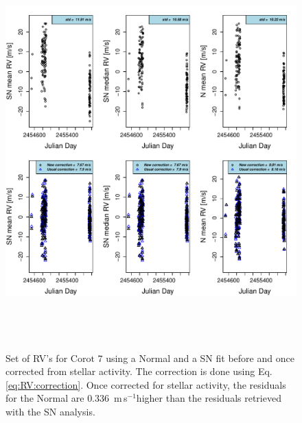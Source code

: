 \documentclass{aa}
\def\ms{\hbox{\,m\,s$^{-1}$}}         %
\begin{document}
\begin{figure} 
\begin{center}
\includegraphics[height = 6in]{NEW_CORRECTIONLRa01_E_[3]CorrectionActivity_RadialVelocity_vs_time.pdf} 
   \caption{Set of RV's for  $\text{Corot }7$ using a Normal and a SN fit before and once corrected from stellar activity. The correction is done using Eq. \ref{eq:RV:correction}. Once corrected for stellar activity, the residuals for the Normal are $0.336$ \ms higher than the residuals retrieved with the SN analysis.}
   \label{fig:Corot-7:correctionRV}
\end{center}
\end{figure}
\end{document}
